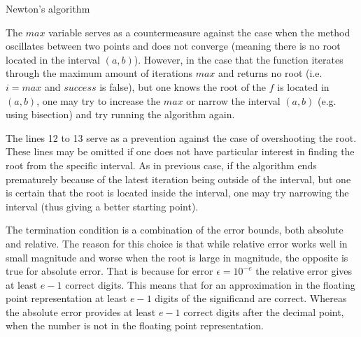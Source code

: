 \documentclass[
  digital, %
  table,   %
  nolof,     %
  nolot,     %
	draft, %
]{fithesis3}
\begin{document}
\begin{algorithm}
  \caption{Newton's algorithm
    \label{alg:newton}}
  \begin{algorithmic}[1]
    \Statex
					\State{}
				\EndIf
					\State{}
				\EndIf
					\State{}
				\EndIf
			\EndFor
			\State{}
    \EndFunction
  \end{algorithmic}
\end{algorithm}
The $max$ variable serves as a countermeasure against the case when the method oscillates between two points and does not converge (meaning there is no root located in the interval $(a,b)$). However, in the case that the function iterates through the maximum amount of iterations $max$ and returns no root (i.e. $i = max$ and $success$ is false), but one knows the root of the $f$ is located in $(a,b)$, one may try to increase the $max$ or narrow the interval $(a,b)$ (e.g. using bisection) and try running the algorithm again.
 
The lines 12 to 13 serve as a prevention against the case of overshooting the root. These lines may be omitted if one does not have particular interest in finding the root from the specific interval. As in previous case, if the algorithm ends prematurely because of the latest iteration being outside of the interval, but one is certain that the root is located inside the interval, one may try narrowing the interval (thus giving a better starting point).

The termination condition is a combination of the error bounds, both absolute and relative. The reason for this choice is that while relative error works well in small magnitude and worse when the root is large in magnitude, the opposite is true for absolute error. That is because for error $\epsilon = 10^{-e}$ the relative error gives at least $e-1$ correct digits. This means that for an approximation in the floating point representation at least $e-1$ digits of the significand are correct. Whereas the absolute error provides at least $e-1$ correct digits after the decimal point, when the number is not in the floating point representation. 
\end{document}

